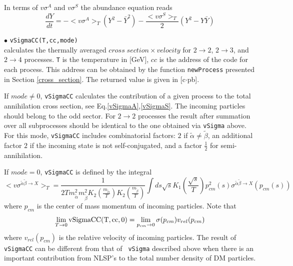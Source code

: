 \documentclass[12pt,a4paper]{article}
\begin{document}
In terms of $v\sigma^A$ and $v\sigma^S$ the abundance equation 
reads
\begin{equation}
    \frac{dY}{dt}= -<v\sigma^A>_T ( Y^2 - \bar{Y}^2) - \frac{<v\sigma^S>_T}{2}( Y^2 - Y\bar{Y}) 
\end{equation}

\noindent
 $\bullet$    \verb|vSigmaCC(T,cc,mode)|\\
  calculates  the thermally  averaged  $cross\; section
\times velocity$ for $2\to2$, $2\to3$, and $2\to4$ processes. \verb|T| is the temperature in
[GeV],  $cc$ is the address of the code for each process. This address
can be obtained by the function {\tt newProcess} presented in  Section
\ref{cross_section}. The returned value  is given in [c$\cdot$pb]. 

 If $mode\ne 0$, \verb|vSigmaCC|  calculates  the contribution of a given
process to the total annihilation cross section,  see Eq.\ref{vSigmaA},\ref{vSigmaS}. The
 incoming particles should belong to the odd sector.  For $2\to2$ processes the result after summation over all subprocesses  should
be identical to the one obtained via {\tt vSigma}  above. For this mode,
\verb|vSigmaCC|  includes combinatorial  factors: $2$ if $\tilde\alpha \ne
\tilde\beta$, an additional factor $2$ if the incoming state is not self-conjugated, and a factor
$\frac{1}{2}$  for semi-annihilation.   

If $mode=0$, {\tt vSigmaCC} is  defined by the integral
$$ <v \sigma^{\tilde\alpha\tilde\beta\to X}>_T=  \frac{1}{2 T
m_{\tilde\alpha}^2 m_{\tilde\beta}^2
K_2(\frac{m_{\tilde\alpha}}{T})K_2(\frac{m_{\tilde\beta}}{T})} \int ds \sqrt{s}
K_1(\frac{\sqrt{s}}{T})p_{cm}^2(s)\sigma^{\tilde\alpha\tilde\beta\to X}(p_{cm}(s))$$  
where $p_{cm}$ is the center of mass momentum of incoming particles.  Note that
$$\lim_{T\to 0} {\rm vSigmaCC(T,cc,0)}=\lim_{p_{cm}\to 0} \sigma(p_{cm}) v_{rel}(p_{cm}) $$ 
where   $v_{rel}(p_{cm})$ is the relative velocity of incoming particles.   The
result of {\tt vSigmaCC} can be different from that of {\tt
vSigma} described  above when there is an important contribution from NLSP's to the total
number density of DM particles. \\
 
\end{document}
